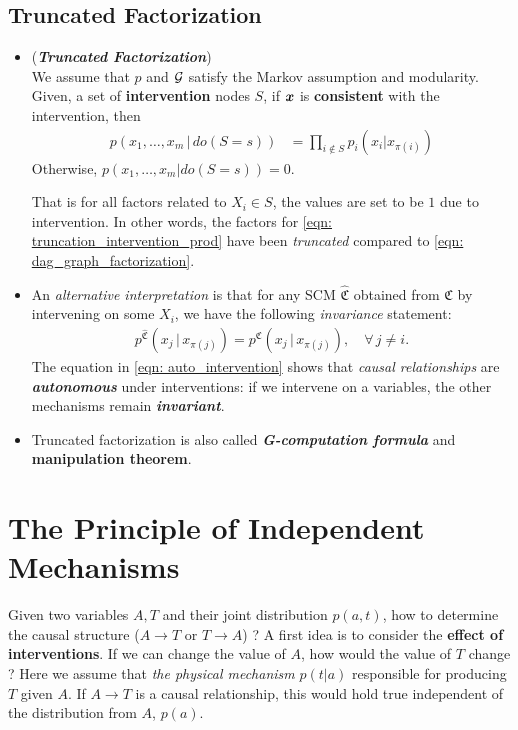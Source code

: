 \documentclass[11pt]{article}
\begin{document}
\subsection{Truncated Factorization}
\begin{itemize}
\item \begin{proposition} (\emph{\textbf{Truncated Factorization}})  \citep{pearl2000causal, peters2017elements, neal2020introduction}\\
We assume that $p$ and ${\mathcal G}$ satisfy the Markov assumption and modularity. Given, a set of \textbf{intervention} nodes $S$, if $\boldsymbol{x}$ is \textbf{consistent} with the intervention, then
\begin{align}
p(x_1, \ldots, x_{m} \,|\, do(S = s)) &= \prod_{ i\not\in S}p_i(x_i | x_{\pi(i)}) \label{eqn: truncation_intervention_prod}
\end{align}
Otherwise, $p(x_1, \ldots, x_{m} | do(S = s)) = 0$.
\end{proposition} That is for all factors related to $X_i \in S$, the values are set to be $1$ due to intervention. In other words, the
factors for \eqref{eqn: truncation_intervention_prod} have been \emph{truncated} compared to \eqref{eqn: dag_graph_factorization}.

\item An \emph{alternative interpretation} is that for any SCM $\widehat{\mathfrak{C}}$ obtained from $\mathfrak{C}$ by intervening on some $X_i$, we have the following \emph{invariance} statement:
\begin{align}
p^{\widehat{\mathfrak{C}}}(x_j \,|\,x_{\pi(j)}) = p^{\mathfrak{C}}(x_j \,|\,x_{\pi(j)}), \quad \forall\, j \neq i.  \label{eqn: auto_intervention}
\end{align} The equation in \eqref{eqn: auto_intervention} shows that \emph{causal relationships} are \emph{\textbf{autonomous}} under interventions: if we intervene on a variables, the other mechanisms remain \textbf{\emph{invariant}}. 

\item Truncated factorization is also called \emph{\textbf{G-computation formula}} \citep{imbens2015causal} and \textbf{manipulation theorem}.
\end{itemize}


\section{The Principle of Independent Mechanisms}
Given two variables $A, T$ and their joint distribution $p(a, t)$, how to determine the causal structure ($A\rightarrow T$ or $T\rightarrow A$) ?  A first idea is to consider the \textbf{effect of interventions}. If we can change the value of $A$, how would the value of $T$ change ? Here we assume that \emph{the physical mechanism} $p(t | a)$
responsible for producing $T$ given $A$. If $A\rightarrow T$ is a causal relationship, this would hold true independent of the distribution from $A$, $p(a)$. 
\end{document}
